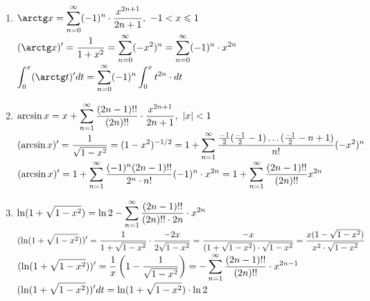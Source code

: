\begin{examples}
\begin{enumerate}
		Тогда при $|x|<1$ ряд сходится, значит и рассматриваемый изначально тоже сходится, и именно к $(1+x)^\al$.\\
		Получили требуемое.
		\item $\ds\arctg x=\ss[0](-1)^n\cdot\frac{x^{2n+1}}{2n+1},\ -1<x\le1$\\
		$\ds(\arctg x)'=\frac1{1+x^2}=\ss[0](-x^2)^n=\ss[0](-1)^n\cdot x^{2n}$\\
		$\ds\int_0^x(\arctg t)'dt=\ss[0](-1)^n\int_0^xt^{2n}\cdot dt$
		\item $\ds\arcsin x=x+\ss[1]\frac{(2n-1)!!}{(2n)!!}\cdot\frac{x^{2n+1}}{2n+1},\ |x|<1$\\
		$\ds(\arcsin x)'=\frac1{\sqrt{1-x^2}}=(1-x^2)^{-1/2}=1+\ss[1]\frac{\frac{-1}2(\frac{-1}2-1)\dots(\frac{-1}2-n+1)}{n!}(-x^2)^n$\\
		$\ds(\arcsin x)'=1+\ss[1]\frac{(-1)^n(2n-1)!!}{2^n\cdot n!}(-1)^n\cdot x^{2n}=1+\ss[1]\frac{(2n-1)!!}{(2n)!!}x^{2n}$
		\item $\ds\ln(1+\sqrt{1-x^2})=\ln2-\ss[1]\frac{(2n-1)!!}{(2n)!!\cdot 2n}\cdot x^{2n}$\\
		$\displaystyle(\ln(1+\sqrt{1-x^2}))'=\frac1{1+\sqrt{1-x^2}}\cdot\frac{-2x}{2\sqrt{1-x^2}}=\frac{-x}{(1+\sqrt{1-x^2})\cdot\sqrt{1-x^2}}=\frac{x(1-\sqrt{1-x^2})}{x^2\cdot\sqrt{1-x^2}}$\\
		$\ds(\ln(1+\sqrt{1-x^2}))'=\frac1x\l(1-\frac1{\sqrt{1-x^2}}\r)=-\ss[1]\frac{(2n-1)!!}{(2n)!!}\cdot x^{2n-1}$\\
		$\displaystyle(\ln(1+\sqrt{1-x^2}))'dt=\ln(1+\sqrt{1-x^2})\cdot\ln2$
	\end{enumerate}
\end{examples}
